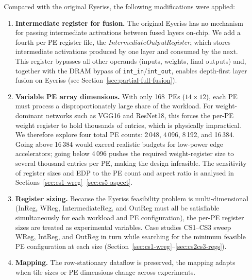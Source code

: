 Compared with the original Eyeriss, the following modifications were
applied:

\begin{enumerate}
  \item \textbf{Intermediate register for fusion.}
        The original Eyeriss has no mechanism for passing intermediate
        activations between fused layers on-chip.
        We add a fourth per-PE register file, the
        \emph{IntermediateOutputRegister}, which stores intermediate
        activations produced by one layer and consumed by the next.
        This register bypasses all other operands (inputs, weights,
        final outputs) and, together with the DRAM bypass of
        \texttt{int\_in}/\texttt{int\_out}, enables depth-first
        layer fusion on Eyeriss
        (see Section~\ref{sec:partial-full-fusion}).

  \item \textbf{Variable PE array dimensions.}
        With only 168~PEs ($14 \times 12$), each PE must process a
        disproportionately large share of the workload.
        For weight-dominant networks such as VGG16 and ResNet18, this
        forces the per-PE weight register to hold thousands of entries,
        which is physically impractical.
        We therefore explore four total PE counts:
        2\,048, 4\,096, 8\,192, and 16\,384.
        Going above 16\,384 would exceed realistic budgets for
        low-power edge accelerators; going below 4\,096 pushes the
        required weight-register size to several thousand entries per PE,
        making the design infeasible.
        The sensitivity of register sizes and EDP to the PE count and
        aspect ratio is analysed in
        Sections~\ref{sec:cs1-wreg}--\ref{sec:cs5-aspect}.

  \item \textbf{Register sizing.}
        Because the Eyeriss feasibility problem is multi-dimensional
        (InReg, WReg, IntermediateReg, and OutReg must all be
        satisfiable simultaneously for each workload and PE
        configuration), the per-PE register sizes are treated as
        experimental variables.
        Case studies CS1--CS3 sweep WReg, IntReg, and OutReg in turn
        while searching for the minimum feasible PE configuration at
        each size (Section~\ref{sec:cs1-wreg}--\ref{sec:cs2cs3-regs}).

  \item \textbf{Mapping.}
        The row-stationary dataflow is preserved, the mapping adapts when tile sizes or PE
        dimensions change across experiments.
\end{enumerate}

